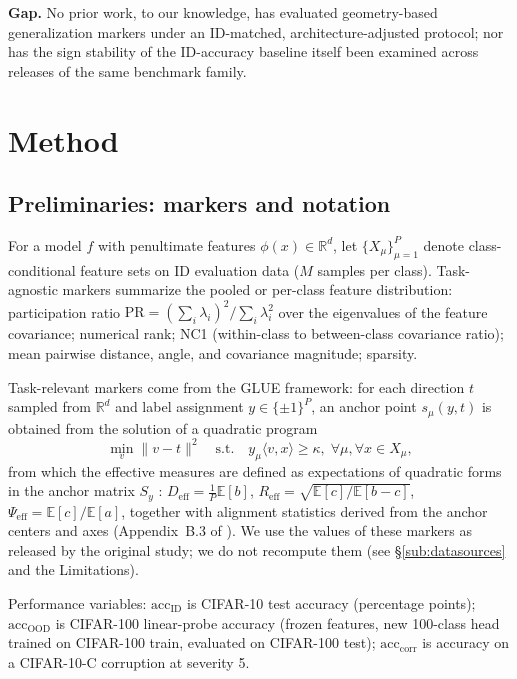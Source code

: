 \documentclass[10pt]{article} %
\newcommand{\srcref}[1]{\S\ref{#1}}
\begin{document}
\textbf{Gap.} No prior work, to our knowledge, has evaluated geometry-based generalization markers under an ID-matched, architecture-adjusted protocol; nor has the sign stability of the ID-accuracy baseline itself been examined across releases of the same benchmark family.

\section{Method}
\label{sec:method}

\subsection{Preliminaries: markers and notation}
\label{sub:prelim}

For a model $f$ with penultimate features $\phi(x) \in \mathbb{R}^d$, let $\{X_\mu\}_{\mu=1}^P$ denote class-conditional feature sets on ID evaluation data ($M$ samples per class). Task-agnostic markers summarize the pooled or per-class feature distribution: participation ratio $\mathrm{PR} = (\sum_i \lambda_i)^2 / \sum_i \lambda_i^2$ over the eigenvalues of the feature covariance; numerical rank; NC1 (within-class to between-class covariance ratio); mean pairwise distance, angle, and covariance magnitude; sparsity.

Task-relevant markers come from the GLUE framework: for each direction $t$ sampled from $\mathbb{R}^d$ and label assignment $y \in \{\pm 1\}^P$, an anchor point $s_\mu(y,t)$ is obtained from the solution of a quadratic program
\begin{equation}
\min_v \|v - t\|^2 \quad \text{s.t.} \quad y_\mu \langle v, x \rangle \ge \kappa, \; \forall \mu, \forall x \in X_\mu ,
\end{equation}
from which the effective measures are defined as expectations of quadratic forms in the anchor matrix $S_y$ \citep{chou2025feature}: $D_{\mathrm{eff}} = \frac{1}{P}\mathbb{E}[b]$, $R_{\mathrm{eff}} = \sqrt{\mathbb{E}[c]/\mathbb{E}[b-c]}$, $\Psi_{\mathrm{eff}} = \mathbb{E}[c]/\mathbb{E}[a]$, together with alignment statistics derived from the anchor centers and axes (Appendix~B.3 of \citet{chou2025feature}). We use the values of these markers as released by the original study; we do not recompute them (see \srcref{sub:datasources} and the Limitations).

Performance variables: $\mathrm{acc}_{\mathrm{ID}}$ is CIFAR-10 test accuracy (percentage points); $\mathrm{acc}_{\mathrm{OOD}}$ is CIFAR-100 linear-probe accuracy (frozen features, new 100-class head trained on CIFAR-100 train, evaluated on CIFAR-100 test); $\mathrm{acc}_{\mathrm{corr}}$ is accuracy on a CIFAR-10-C corruption at severity 5.
\end{document}
